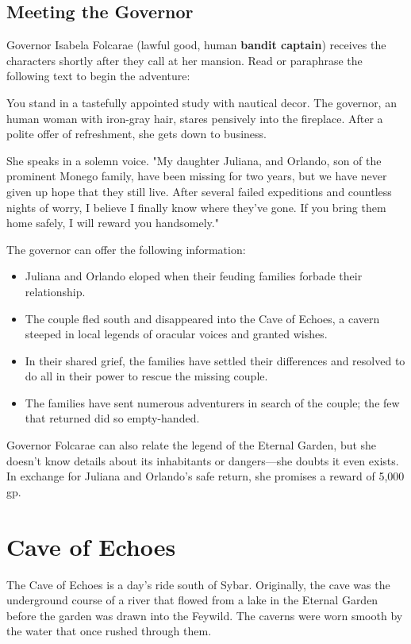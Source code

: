 \documentclass[10pt,a4paper,twoside,bg=print,twocolumn,openany,nodeprecatedcode]{dndbook}
\begin{document}
\subsection{Meeting the Governor}
Governor Isabela Folcarae (lawful good, human \textbf{bandit captain}) receives the characters shortly after they call at her mansion. Read or paraphrase the following text to begin the adventure:

\begin{DndReadAloud}{}
You stand in a tastefully appointed study with nautical decor. The governor, an human woman with iron-gray hair, stares pensively into the fireplace. After a polite offer of refreshment, she gets down to business.

She speaks in a solemn voice. "My daughter Juliana, and Orlando, son of the prominent Monego family, have been missing for two years, but we have never given up hope that they still live. After several failed expeditions and countless nights of worry, I believe I finally know where they've gone. If you bring them home safely, I will reward you handsomely."

\end{DndReadAloud}

The governor can offer the following information:


\begin{itemize}
\item Juliana and Orlando eloped when their feuding families forbade their relationship.
\item The couple fled south and disappeared into the Cave of Echoes, a cavern steeped in local legends of oracular voices and granted wishes.
\item In their shared grief, the families have settled their differences and resolved to do all in their power to rescue the missing couple.
\item The families have sent numerous adventurers in search of the couple; the few that returned did so empty-handed.
\end{itemize}

Governor Folcarae can also relate the legend of the Eternal Garden, but she doesn't know details about its inhabitants or dangers—she doubts it even exists. In exchange for Juliana and Orlando's safe return, she promises a reward of 5,000 gp.

\section{Cave of Echoes}
The Cave of Echoes is a day's ride south of Sybar. Originally, the cave was the underground course of a river that flowed from a lake in the Eternal Garden before the garden was drawn into the Feywild. The caverns were worn smooth by the water that once rushed through them.
\end{document}
